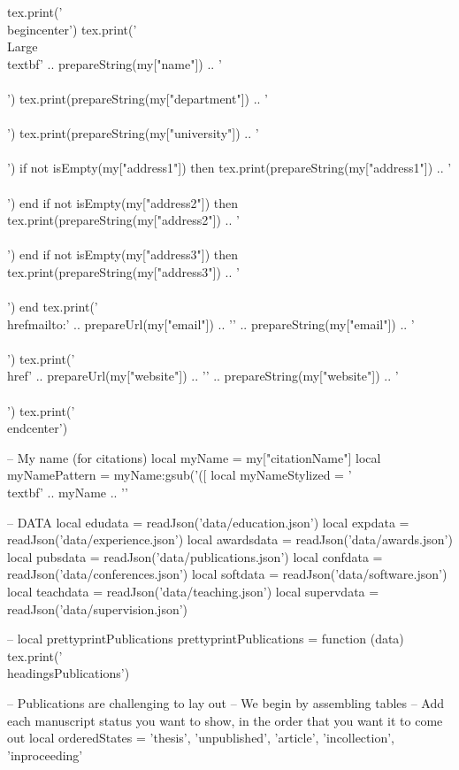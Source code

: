 \documentclass[letterpaper, 10pt]{article}
\newcommand{\headings}[1]{\section*{#1} \hrule \vspace{10pt}}
\begin{document}
\begin{luacode}
	tex.print('\\begin{center}')
	tex.print('{\\Large \\textbf{' .. prepareString(my["name"]) .. '}}\\\\')
	tex.print(prepareString(my["department"]) .. '\\\\')
	tex.print(prepareString(my["university"]) .. '\\\\')
	if not isEmpty(my["address1"]) then
		tex.print(prepareString(my["address1"]) .. '\\\\')
	end
	if not isEmpty(my["address2"]) then
		tex.print(prepareString(my["address2"]) .. '\\\\')
	end
	if not isEmpty(my["address3"]) then
		tex.print(prepareString(my["address3"]) .. '\\\\')
	end
	tex.print('\\href{mailto:' .. prepareUrl(my["email"]) .. '}{' .. prepareString(my["email"]) .. '} \\\\')
	tex.print('\\href{' .. prepareUrl(my["website"]) .. '}{' .. prepareString(my["website"]) .. '} \\\\')
	tex.print('\\end{center}')

	-- My name (for citations)
	local myName = my["citationName"]
	local myNamePattern = myName:gsub('([%
	local myNameStylized = '\\textbf{' .. myName .. '}'

	-- DATA
	local edudata = readJson('data/education.json')
	local expdata = readJson('data/experience.json')
	local awardsdata = readJson('data/awards.json')
	local pubsdata = readJson('data/publications.json')
	local confdata = readJson('data/conferences.json')
	local softdata = readJson('data/software.json')
	local teachdata = readJson('data/teaching.json')
	local supervdata = readJson('data/supervision.json')

	-- local prettyprintPublications
	prettyprintPublications = function (data)
		tex.print('\\headings{Publications}')

		-- Publications are challenging to lay out
		-- We begin by assembling tables
		-- Add each manuscript status you want to show, in the order that you want it to come out
		local orderedStates = {'thesis', 'unpublished', 'article', 'incollection', 'inproceeding'}


\end{luacode}
\end{document}
